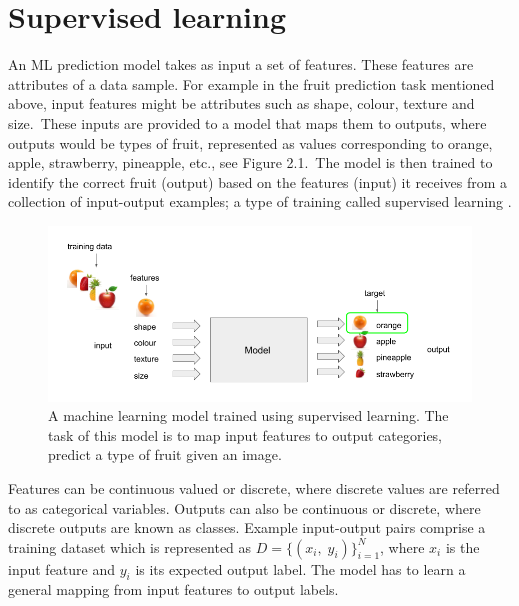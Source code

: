 
\section{Supervised learning}

An ML prediction model takes as input a set of features. These features are attributes of a data sample. For example in the fruit prediction task mentioned above, input features might be attributes such as shape, colour, texture and size.\ These inputs are provided to a model that maps them to outputs, where outputs would be types of fruit, represented as values corresponding to orange, apple, strawberry, pineapple, etc., see Figure 2.1.\ The model is then trained to identify the correct fruit (output) based on the features (input) it receives from a collection of input-output examples; a type of training called supervised learning \citep{bishop2006pattern, hastie2009elements, murphy2012machine}.

\begin{figure}[H]
   	\centering
    	\includegraphics[width=1.0\textwidth, height=0.4\textwidth]{supervised_learning}
	\captionsetup{justification=centering}
	\caption{A machine learning model trained using supervised learning. The task of this model is to map input features to output categories, predict a type of fruit given an image.}
\end{figure}

\noindent Features can be continuous valued or discrete, where discrete values are referred to as categorical variables. Outputs can also be continuous or discrete, where discrete outputs are known as classes. Example input-output pairs comprise a training dataset which is represented as \begin{math} D = \{(x_i, \; y_i)\}_{i=1}^N \end{math}, where \begin{math} x_i \end{math} is the input feature and \begin{math} y_i \end{math} is its expected output label. The model has to learn a general mapping from input features to output labels. \par

